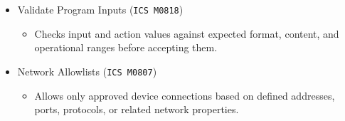 \documentclass[10pt,a4paper,oneside]{report}
\begin{document}
\begin{itemize}
\begin{itemize}
\begin{itemize}
\item Requires devices and software processes to authenticate, especially for remote connections and API access.
\end{itemize}
\item Validate Program Inputs (\texttt{ICS M0818})
\begin{itemize}
\item Checks input and action values against expected format, content, and operational ranges before accepting them.
\end{itemize}
\item Network Allowlists (\texttt{ICS M0807})
\begin{itemize}
\item Allows only approved device connections based on defined addresses, ports, protocols, or related network properties.
\end{itemize}
\end{itemize}
\end{itemize}
\end{document}
